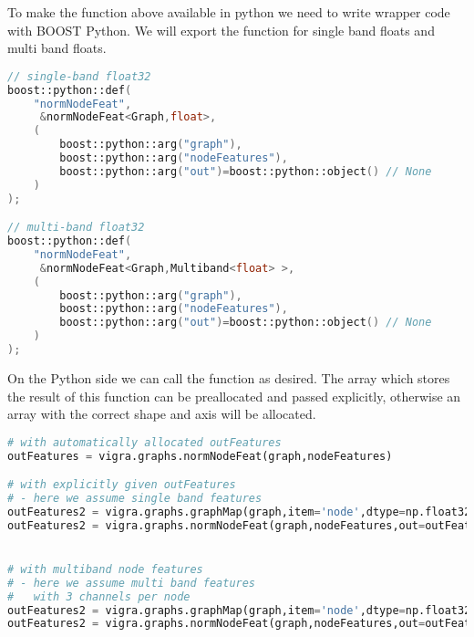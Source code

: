 \begin{minipage}{\textwidth}
To make the function above available in python
we need to write wrapper code with BOOST Python.
We will export the function for single band floats and multi band floats.

\begin{lstlisting}[language=c++]
// single-band float32
boost::python::def(
    "normNodeFeat",
     &normNodeFeat<Graph,float>,
    (
        boost::python::arg("graph"),
        boost::python::arg("nodeFeatures"),
        boost::python::arg("out")=boost::python::object() // None
    )
);

// multi-band float32
boost::python::def(
    "normNodeFeat",
     &normNodeFeat<Graph,Multiband<float> >,
    (
        boost::python::arg("graph"),
        boost::python::arg("nodeFeatures"),
        boost::python::arg("out")=boost::python::object() // None
    )
);
\end{lstlisting}

\end{minipage}


On the Python side we can call the function as desired.
The array which stores the result of this
function can be preallocated and passed explicitly,
otherwise an array with the correct shape and axis will be
allocated.


\begin{lstlisting}[language=Python]
# with automatically allocated outFeatures
outFeatures = vigra.graphs.normNodeFeat(graph,nodeFeatures)

# with explicitly given outFeatures
# - here we assume single band features
outFeatures2 = vigra.graphs.graphMap(graph,item='node',dtype=np.float32)
outFeatures2 = vigra.graphs.normNodeFeat(graph,nodeFeatures,out=outFeatures2)


# with multiband node features 
# - here we assume multi band features
#   with 3 channels per node
outFeatures2 = vigra.graphs.graphMap(graph,item='node',dtype=np.float32,channels=3)
outFeatures2 = vigra.graphs.normNodeFeat(graph,nodeFeatures,out=outFeatures2)
\end{lstlisting}

